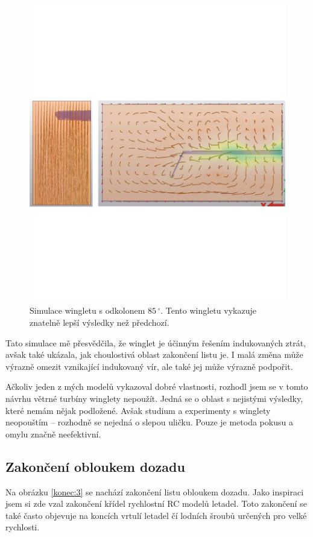 \begin{figure}[H]
	\centering
	\includegraphics[]{obrazky/simulace/simulace8p}
	\caption{Simulace wingletu s odkolonem $85\,^{\circ}$. Tento wingletu vykazuje znatelně lepší výsledky než předchozí.}
	\label{sim:8}
\end{figure}
Tato simulace mě přesvědčila, že winglet je účinným řešením indukovaných ztrát, avšak také ukázala, jak choulostivá oblast zakončení listu je. I malá změna může výrazně omezit vznikající indukovaný vír, ale také jej může výrazně podpořit.

Ačkoliv jeden z mých modelů vykazoval dobré vlastnosti, rozhodl jsem se v tomto návrhu větrné turbíny winglety nepoužít. Jedná se o oblast s nejistými výsledky, které nemám nějak podložené. Avšak studium a experimenty s winglety neopouštím – rozhodně se nejedná o slepou uličku. Pouze je metoda pokusu a omylu značně neefektivní.

\subsection{Zakončení obloukem dozadu}

Na obrázku \ref{konec:3} se nachází zakončení listu obloukem dozadu. Jako inspiraci jsem si zde vzal zakončení křídel rychlostní RC modelů letadel. Toto zakončení se také často objevuje na koncích vrtulí letadel čí lodních šroubů určených pro velké rychlosti.

